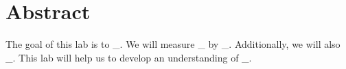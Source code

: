 \documentclass[../Lab.tex]{subfiles}
\begin{document}
\section{Abstract}

The goal of this lab is to \_. We will measure \_ by \_. Additionally, we will also \_. This lab will help us to develop an understanding of \_.
\end{document}
